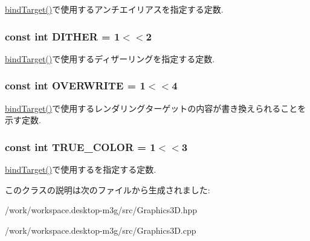\hyperlink{classm3g_1_1Graphics3D_d34fb1ab11f2e25b98b93affd71dcc05}{bindTarget()}で使用するアンチエイリアスを指定する定数. \hypertarget{classm3g_1_1Graphics3D_3750f57b82328be988bdab3b672a64f9}{
\subsubsection[{DITHER}]{\setlength{\rightskip}{0pt plus 5cm}const int {\bf DITHER} = 1$<$$<$2}}
\label{classm3g_1_1Graphics3D_3750f57b82328be988bdab3b672a64f9}


\hyperlink{classm3g_1_1Graphics3D_d34fb1ab11f2e25b98b93affd71dcc05}{bindTarget()}で使用するディザーリングを指定する定数. \hypertarget{classm3g_1_1Graphics3D_f448f7f447a301823af9170bfe84c50e}{
\subsubsection[{OVERWRITE}]{\setlength{\rightskip}{0pt plus 5cm}const int {\bf OVERWRITE} = 1$<$$<$4}}
\label{classm3g_1_1Graphics3D_f448f7f447a301823af9170bfe84c50e}


\hyperlink{classm3g_1_1Graphics3D_d34fb1ab11f2e25b98b93affd71dcc05}{bindTarget()}で使用するレンダリングターゲットの内容が書き換えられることを示す定数. \hypertarget{classm3g_1_1Graphics3D_bbd22a6baea672f895d5ef32e2438ec6}{
\subsubsection[{TRUE\_\-COLOR}]{\setlength{\rightskip}{0pt plus 5cm}const int {\bf TRUE\_\-COLOR} = 1$<$$<$3}}
\label{classm3g_1_1Graphics3D_bbd22a6baea672f895d5ef32e2438ec6}


\hyperlink{classm3g_1_1Graphics3D_d34fb1ab11f2e25b98b93affd71dcc05}{bindTarget()}で使用するを指定する定数. 

このクラスの説明は次のファイルから生成されました:\begin{CompactItemize}
\item 
/work/workspace.desktop-m3g/src/Graphics3D.hpp\item 
/work/workspace.desktop-m3g/src/Graphics3D.cpp\end{CompactItemize}
